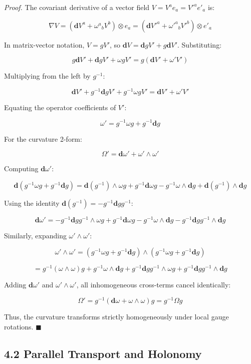 \documentclass[11pt,twoside,openright]{amsbook}
\begin{document}
{{{{{{\textit{Proof.} The covariant derivative of a vector field $V = V^a e_a = V'^a e'_a$ is:

$$\nabla V = (\mathbf{d}V^a + \omega^a{}_b V^b) \otimes e_a = (\mathbf{d}V'^a + \omega'^a{}_b V'^b) \otimes e'_a$$

In matrix-vector notation, $V = g V'$, so $\mathbf{d}V = \mathbf{d}g V' + g \mathbf{d}V'$. Substituting:

$$g \mathbf{d}V' + \mathbf{d}g V' + \omega g V' = g (\mathbf{d}V' + \omega' V')$$

Multiplying from the left by $g^{-1}$:

$$\mathbf{d}V' + g^{-1}\mathbf{d}g V' + g^{-1}\omega g V' = \mathbf{d}V' + \omega' V'$$

Equating the operator coefficients of $V'$:

$$\omega' = g^{-1} \omega g + g^{-1} \mathbf{d}g$$

For the curvature 2-form:

$$\Omega' = \mathbf{d}\omega' + \omega' \wedge \omega'$$

Computing $\mathbf{d}\omega'$:

$$\mathbf{d}(g^{-1} \omega g + g^{-1}\mathbf{d}g) = \mathbf{d}(g^{-1}) \wedge \omega g + g^{-1}\mathbf{d}\omega g - g^{-1}\omega \wedge \mathbf{d}g + \mathbf{d}(g^{-1}) \wedge \mathbf{d}g$$

Using the identity $\mathbf{d}(g^{-1}) = -g^{-1}\mathbf{d}g g^{-1}$:

$$\mathbf{d}\omega' = -g^{-1}\mathbf{d}g g^{-1} \wedge \omega g + g^{-1}\mathbf{d}\omega g - g^{-1}\omega \wedge \mathbf{d}g - g^{-1}\mathbf{d}g g^{-1} \wedge \mathbf{d}g$$

Similarly, expanding $\omega' \wedge \omega'$:

$$\omega' \wedge \omega' = (g^{-1}\omega g + g^{-1}\mathbf{d}g) \wedge (g^{-1}\omega g + g^{-1}\mathbf{d}g)$$

$$= g^{-1}(\omega \wedge \omega) g + g^{-1}\omega \wedge \mathbf{d}g + g^{-1}\mathbf{d}g g^{-1} \wedge \omega g + g^{-1}\mathbf{d}g g^{-1} \wedge \mathbf{d}g$$

Adding $\mathbf{d}\omega'$ and $\omega' \wedge \omega'$, all inhomogeneous cross-terms cancel identically:

$$\Omega' = g^{-1}(\mathbf{d}\omega + \omega \wedge \omega) g = g^{-1} \Omega g$$

Thus, the curvature transforms strictly homogeneously under local gauge rotations. $\blacksquare$

\subsection{4.2 Parallel Transport and Holonomy}

}}}}}}
\end{document}
